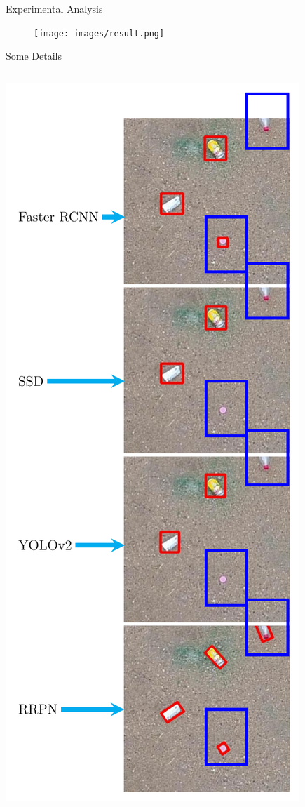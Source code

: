 \documentclass[newPxFont, fullfooter, sectionpages, progressbar, displaynote]{beamer}
\begin{document}
\begin{frame}{Experimental Analysis}
	\begin{figure}
		\centering
	 	\texttt{[image: images/result.png]}
 	\end{figure}
\end{frame}

\begin{frame}{Some Details}
	\begin{columns}
		\begin{column}{.48\linewidth}
			\includegraphics[height=1.0\textheight]{images/results_room1.pdf}

\end{column}
\end{columns}
\end{frame}
\end{document}

